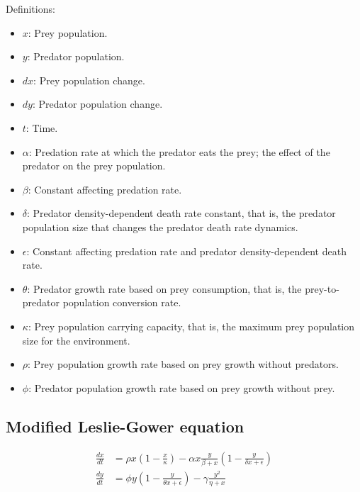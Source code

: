 Definitions:
\begin{itemize}
\item $x$: Prey population.
\item $y$: Predator population.
\item $dx$: Prey population change.
\item $dy$: Predator population change.
\item $t$: Time.
\item $\alpha$: Predation rate at which the predator eats the prey; the effect of the predator on the prey population.
\item $\beta$: Constant affecting predation rate.
\item $\delta$: Predator density-dependent death rate constant, that is, the predator population size that changes the predator death rate dynamics.
\item $\epsilon$: Constant affecting predation rate and predator density-dependent death rate.
\item $\theta$: Predator growth rate based on prey consumption, that is, the prey-to-predator population conversion rate.
\item $\kappa$: Prey population carrying capacity, that is, the maximum prey population size for the environment.
\item $\rho$: Prey population growth rate based on prey growth without predators.
\item $\phi$: Predator population growth rate based on prey growth without prey.
\end{itemize}

\subsection{Modified Leslie-Gower equation}
\begin{align*}
\frac{dx}{dt} &= \rho x \left(1 - \frac{x}{\kappa}\right) - \alpha x \frac{y}{\beta + x} \left(1 - \frac{y}{\delta x + \epsilon}\right) \\
\frac{dy}{dt} &= \phi y \left(1 - \frac{y}{\theta x + \epsilon}\right) - \gamma \frac{y^2}{\eta + x}
\end{align*}

